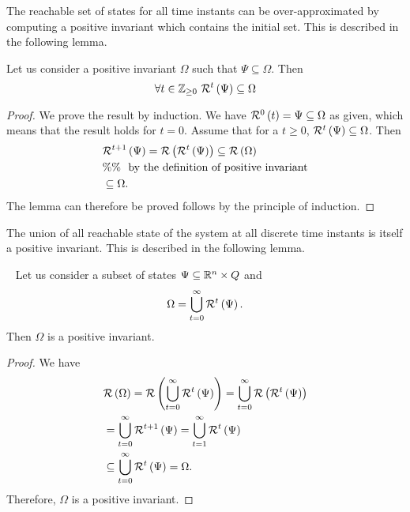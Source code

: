 %
The reachable set of states for all time instants can be
over-approximated by computing a positive invariant which contains the
initial set.  This is described in the following lemma.
%
\begin{lemma}
Let us consider a positive invariant $\Omega$ such that
$\Psi\subseteq\Omega$.  Then 
%
\[
\forall t\in\mathbb{Z}_{\geq 0}~\mathcal{R}^{t}\left(\Psi\right)\subseteq\Omega
\]
%
\end{lemma}
%
\begin{proof}
We prove the result by induction.  We have
$\mathcal{R}^{0}\left(t\right)=\Psi\subseteq\Omega$ as given, which means that the
result holds for $t=0$.  Assume that for a $t\geq 0$,
$\mathcal{R}^{t}\left(\Psi\right)\subseteq\Omega$.  Then 
%
\begin{align*}
&
\mathcal{R}^{t+1}\left(\Psi\right)=\mathcal{R}\left(\mathcal{R}^{t}\left(\Psi\right)\right)\subseteq\mathcal{R}\left(\Omega\right)\\
& \%\%~~\text{by the definition of positive invariant}\\
& \subseteq \Omega.
\end{align*}
%
The lemma can therefore be proved follows by the principle of induction.
\end{proof}
%
The union of all reachable state of the system at all discrete time
instants is itself a positive invariant.  This is described in the
following lemma.
%
\begin{lemma}~\label{lem:exact-pi}
Let us consider a subset of states
$\Psi\subseteq\mathbb{R}^n\times Q$ and
%
\[
\Omega=\bigcup_{t=0}^\infty\mathcal{R}^{t}\left(\Psi\right).
\]
%
Then $\Omega$ is a positive invariant.
\end{lemma}
%
\begin{proof}
We have 
%
\begin{align*}
& \mathcal{R}\left(\Omega\right)=\mathcal{R}\left(\bigcup_{t=0}^\infty\mathcal{R}^{t}\left(\Psi\right)\right) = \bigcup_{t=0}^\infty\mathcal{R}\left(\mathcal{R}^{t}\left(\Psi\right)\right)\\
& = \bigcup_{t=0}^\infty\mathcal{R}^{t+1}\left(\Psi\right)= \bigcup_{t=1}^\infty\mathcal{R}^{t}\left(\Psi\right)\\
& \subseteq  \bigcup_{t=0}^\infty\mathcal{R}^{t}\left(\Psi\right)=\Omega.
\end{align*}
%
Therefore, $\Omega$ is a positive invariant.
\end{proof}
%























